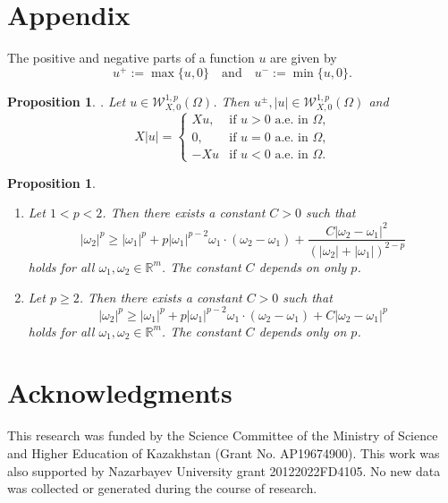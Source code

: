 \documentclass[a4paper,12pt,reqno]{amsart}
\numberwithin{equation}{section}
\theoremstyle{plain}
\newtheorem{proposition}[theorem]{Proposition}
\theoremstyle{definition}
\begin{document}
\section{Appendix}
The positive and negative parts of a function $u$ are given by
$$u^{+}:=\max \{u, 0\}\quad\text{and}\quad u^{-}:=\min \{u, 0\}.$$
\begin{proposition}\label{proposition Xu} \cite[Lemma 3.5]{garofalo1996isoperimetric}. 
Let $u \in \mathcal{W}_{X,0}^{1, p}(\Omega)$. Then  $u^{\pm},|u| \in \mathcal{W}_{X,0}^{1, p}(\Omega)$ and 
\begin{equation*}
X|u|=\begin{cases}
Xu, & \text{if $u>0$ a.e.  in $\Omega$,}\\
0, & \text{if $u= 0$ a.e.  in $\Omega$,}\\
-Xu & \text{if $u<0$ a.e.  in $\Omega$.}
\end{cases}
\end{equation*}
\end{proposition}

\begin{proposition}\label{convexity inequality}\cite[Lemma 4.2]{Lin1990}
\begin{enumerate}[label=(\roman*)]
\item  Let $1<p<2$. Then there exists a constant $C>0$ such that
\begin{equation}\label{convexity (b)}
|\omega_{2}|^{p} \geq|\omega_{1}|^{p}+p|\omega_{1}|^{p-2} \omega_{1} \cdot(\omega_{2}-\omega_{1})+ \frac{C|\omega_{2}-\omega_{1}|^{2}}{(|\omega_{2}|+|\omega_{1}|)^{2-p}} 
\end{equation}
holds  for all $\omega_{1}, \omega_{2} \in \mathbb{R}^{m}$. The constant $C$ depends on only $p$.

\item  Let $p \geq 2$. Then there exists a constant $C>0$ such that
\begin{equation}\label{convexity (a)}
|\omega_{2}|^{p} \geq|\omega_{1}|^{p}+p|\omega_{1}|^{p-2} \omega_{1} \cdot(\omega_{2}-\omega_{1})+C|\omega_{2}-\omega_{1}|^{p}
\end{equation}
holds for all $\omega_{1}, \omega_{2} \in \mathbb{R}^{m}$. The constant $C$ depends only on $p$.
\end{enumerate}
\end{proposition}

\section{Acknowledgments}

This research was funded by the Science Committee of the Ministry of Science and Higher Education of Kazakhstan (Grant No. AP19674900). This work was also supported by Nazarbayev University grant 20122022FD4105. No new data was collected or generated during the course of research. 



\end{document}
